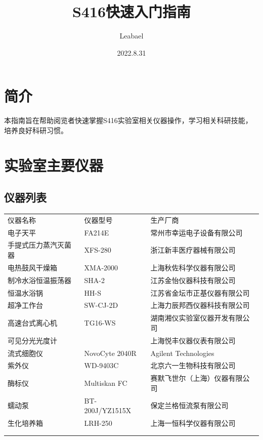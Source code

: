 \documentclass[
]{book}
\title{S416快速入门指南}
\author{Leabael}
\date{2022.8.31}
\begin{document}
\maketitle

{
\setcounter{tocdepth}{1}
\tableofcontents
}
\hypertarget{ux7b80ux4ecb}{%
\chapter{简介}\label{ux7b80ux4ecb}}

本指南旨在帮助阅览者快速掌握S416实验室相关仪器操作，学习相关科研技能，培养良好科研习惯。

\hypertarget{instrument}{%
\chapter{实验室主要仪器}\label{instrument}}

\hypertarget{ux4eeaux5668ux5217ux8868}{%
\section{仪器列表}\label{ux4eeaux5668ux5217ux8868}}

\begin{longtable}[]{@{}
  >{\raggedright\arraybackslash}p{}
  >{\raggedright\arraybackslash}p{}
  >{\raggedright\arraybackslash}p{}@{}}
\toprule()
\endhead
仪器名称 & 仪器型号 & 生产厂商 \\
电子天平 & FA214E & 常州市幸运电子设备有限公司 \\
手提式压力蒸汽灭菌器 & XFS-280 & 浙江新丰医疗器械有限公司 \\
电热鼓风干燥箱 & XMA-2000 & 上海秋佐科学仪器有限公司 \\
制冷水浴恒温振荡器 & SHA-2 & 江苏金怡仪器科技有限公司 \\
恒温水浴锅 & HH-S & 江苏省金坛市正基仪器有限公司 \\
超净工作台 & SW-CJ-2D & 上海力辰邦西仪器科技有限公司 \\
高速台式离心机 & TG16-WS & 湖南湘仪实验室仪器开发有限公司 \\
可见分光光度计 & 721 & 上海悦丰仪器仪表有限公司 \\
流式细胞仪 & NovoCyte 2040R & Agilent Technologies \\
紫外仪 & WD-9403C & 北京六一生物科技有限公司 \\
酶标仪 & Multiskan FC & 赛默飞世尔（上海）仪器有限公司 \\
蠕动泵 & BT-200J/YZ1515X & 保定兰格恒流泵有限公司 \\
生化培养箱 & LRH-250 & 上海一恒科学仪器有限公司 \\
& & \\
& & \\
\bottomrule()
\end{longtable}
\end{document}
